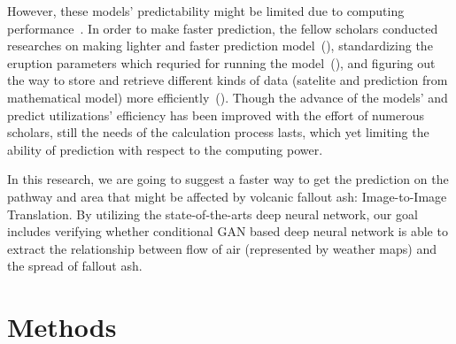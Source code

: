 \documentclass{article}
\begin{document}
\begin{doublespacing}
{  However, these models’ predictability might be limited due to computing 
  performance~\citep[p. 745-746]{Tanaka2022}. In order to make faster prediction, the fellow 
  scholars conducted researches on making lighter and faster prediction model~(\citet{Searcy1998}), 
  standardizing the eruption parameters which requried for running the 
  model~(\citet[p. 7]{Webley2009}), and figuring out the way to store and retrieve different kinds 
  of data (satelite and prediction from mathematical model) more efficiently~(\citet{Sorokin2016}).
  Though the advance of the models' and predict utilizations' efficiency has been improved with the 
  effort of numerous scholars, still the needs of the calculation process lasts, which yet limiting 
  the ability of prediction with respect to the computing power.

  In this research, we are going to suggest a faster way to get the prediction on the pathway and 
  area that might be affected by volcanic fallout ash: Image-to-Image Translation. By utilizing the
  state-of-the-arts deep neural network, our goal includes verifying whether conditional GAN based 
  deep neural network is able to extract the relationship between flow of air (represented by 
  weather maps) and the spread of fallout ash.
}

\section{Methods}  %
\fontsize{11pt}{11pt} 
\end{doublespacing}
\end{document}

